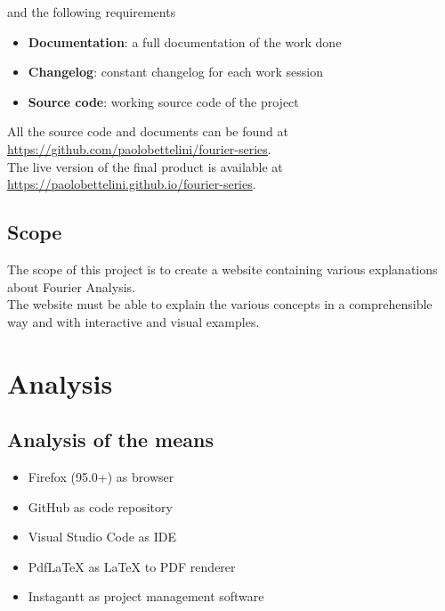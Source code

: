 \documentclass{article}
\begin{document}
and the following requirements

\begin{itemize}
    \item \textbf{Documentation}: a full documentation of the work done
    \item \textbf{Changelog}: constant changelog for each work session
    \item \textbf{Source code}: working source code of the project
\end{itemize}

All the source code and documents can be found at \href{https://github.com/paolobettelini/fourier-series}{https://github.com/paolobettelini/fourier-series}\cite{gitrepo}.
\\
The live version of the final product is available at \href{https://paolobettelini.github.io/fourier-series}{https://paolobettelini.github.io/fourier-series}\cite{gitpages}.

\subsection{Scope}

The scope of this project is to create a website containing various explanations about Fourier Analysis. \\
The website must be able to explain the various concepts in a comprehensible way and with interactive and visual examples.

\pagebreak

\section{Analysis}

\subsection{Analysis of the means}

\begin{itemize}
    \item Firefox (95.0+) as browser
    \item GitHub\cite{github} as code repository
    \item Visual Studio Code as IDE
    \item PdfLaTeX as LaTeX to PDF renderer
    \item Instagantt\cite{instagantt} as project management software
\end{itemize}
\end{document}
